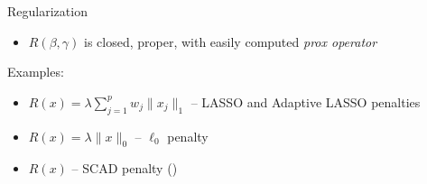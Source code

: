 \documentclass[8pt]{beamer}
\begin{document}
\begin{frame}{Regularization}
\begin{itemize}
	\item $R(\beta, \gamma)$ is closed, proper, with easily computed \textit{prox operator}
\end{itemize}


Examples: 
\begin{itemize}
	\item $R(x) = \lambda\sum_{j=1}^p w_j\|x_j\|_1$ -- LASSO and Adaptive LASSO penalties \cite{Bondell2010,Lin2013}
	\item $R(x) = \lambda \|x\|_0$ -- $\ell_0$ penalty \cite{Vaida2005,Jones2011}
	\item $R(x)$ -- SCAD penalty (\cite{Fan2001,Fan2012})
\end{itemize}


\end{frame}
\end{document}
